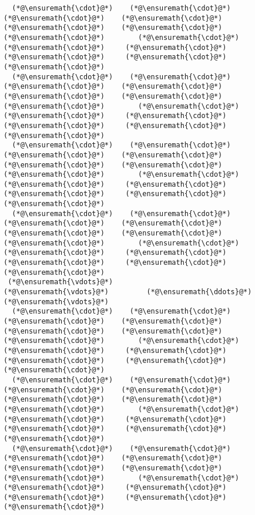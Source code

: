 \documentclass[12pt,landscape]{article}
\begin{document}
{\begin{lstlisting}
  (*@\ensuremath{\cdot}@*)    (*@\ensuremath{\cdot}@*)    (*@\ensuremath{\cdot}@*)    (*@\ensuremath{\cdot}@*)    (*@\ensuremath{\cdot}@*)    (*@\ensuremath{\cdot}@*)    (*@\ensuremath{\cdot}@*)        (*@\ensuremath{\cdot}@*)     (*@\ensuremath{\cdot}@*)     (*@\ensuremath{\cdot}@*)     (*@\ensuremath{\cdot}@*)     (*@\ensuremath{\cdot}@*)     (*@\ensuremath{\cdot}@*) 
  (*@\ensuremath{\cdot}@*)    (*@\ensuremath{\cdot}@*)    (*@\ensuremath{\cdot}@*)    (*@\ensuremath{\cdot}@*)    (*@\ensuremath{\cdot}@*)    (*@\ensuremath{\cdot}@*)    (*@\ensuremath{\cdot}@*)        (*@\ensuremath{\cdot}@*)     (*@\ensuremath{\cdot}@*)     (*@\ensuremath{\cdot}@*)     (*@\ensuremath{\cdot}@*)     (*@\ensuremath{\cdot}@*)     (*@\ensuremath{\cdot}@*) 
  (*@\ensuremath{\cdot}@*)    (*@\ensuremath{\cdot}@*)    (*@\ensuremath{\cdot}@*)    (*@\ensuremath{\cdot}@*)    (*@\ensuremath{\cdot}@*)    (*@\ensuremath{\cdot}@*)    (*@\ensuremath{\cdot}@*)        (*@\ensuremath{\cdot}@*)     (*@\ensuremath{\cdot}@*)     (*@\ensuremath{\cdot}@*)     (*@\ensuremath{\cdot}@*)     (*@\ensuremath{\cdot}@*)     (*@\ensuremath{\cdot}@*) 
  (*@\ensuremath{\cdot}@*)    (*@\ensuremath{\cdot}@*)    (*@\ensuremath{\cdot}@*)    (*@\ensuremath{\cdot}@*)    (*@\ensuremath{\cdot}@*)    (*@\ensuremath{\cdot}@*)    (*@\ensuremath{\cdot}@*)        (*@\ensuremath{\cdot}@*)     (*@\ensuremath{\cdot}@*)     (*@\ensuremath{\cdot}@*)     (*@\ensuremath{\cdot}@*)     (*@\ensuremath{\cdot}@*)     (*@\ensuremath{\cdot}@*) 
 (*@\ensuremath{\vdots}@*)                        (*@\ensuremath{\vdots}@*)         (*@\ensuremath{\ddots}@*)                           (*@\ensuremath{\vdots}@*)    
  (*@\ensuremath{\cdot}@*)    (*@\ensuremath{\cdot}@*)    (*@\ensuremath{\cdot}@*)    (*@\ensuremath{\cdot}@*)    (*@\ensuremath{\cdot}@*)    (*@\ensuremath{\cdot}@*)    (*@\ensuremath{\cdot}@*)        (*@\ensuremath{\cdot}@*)     (*@\ensuremath{\cdot}@*)     (*@\ensuremath{\cdot}@*)     (*@\ensuremath{\cdot}@*)     (*@\ensuremath{\cdot}@*)     (*@\ensuremath{\cdot}@*) 
  (*@\ensuremath{\cdot}@*)    (*@\ensuremath{\cdot}@*)    (*@\ensuremath{\cdot}@*)    (*@\ensuremath{\cdot}@*)    (*@\ensuremath{\cdot}@*)    (*@\ensuremath{\cdot}@*)    (*@\ensuremath{\cdot}@*)        (*@\ensuremath{\cdot}@*)     (*@\ensuremath{\cdot}@*)     (*@\ensuremath{\cdot}@*)     (*@\ensuremath{\cdot}@*)     (*@\ensuremath{\cdot}@*)     (*@\ensuremath{\cdot}@*) 
  (*@\ensuremath{\cdot}@*)    (*@\ensuremath{\cdot}@*)    (*@\ensuremath{\cdot}@*)    (*@\ensuremath{\cdot}@*)    (*@\ensuremath{\cdot}@*)    (*@\ensuremath{\cdot}@*)    (*@\ensuremath{\cdot}@*)        (*@\ensuremath{\cdot}@*)     (*@\ensuremath{\cdot}@*)     (*@\ensuremath{\cdot}@*)     (*@\ensuremath{\cdot}@*)     (*@\ensuremath{\cdot}@*)     (*@\ensuremath{\cdot}@*) 

\end{lstlisting}}
\end{document}
